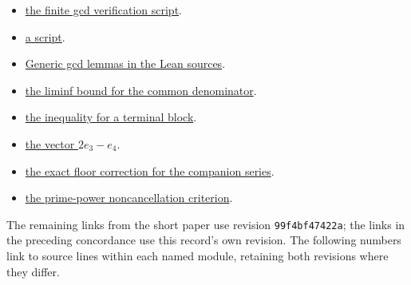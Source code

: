 \begin{itemize}[leftmargin=*]
\item \href{https://github.com/wcook04/plectis-erdos/blob/f36a98bf3d3e6f65f1074e3b800e3293d5b8a51a/ErdosProblems/Erdos68/scripts/check_finite_source.py}{the finite gcd verification script}.
\item \href{https://github.com/wcook04/plectis-erdos/blob/f36a98bf3d3e6f65f1074e3b800e3293d5b8a51a/ErdosProblems/Erdos68/scripts/check_moment_saturation.py}{a script}.
\item \href{https://github.com/wcook04/plectis-erdos/blob/f36a98bf3d3e6f65f1074e3b800e3293d5b8a51a/ErdosProblems/Erdos68/TailIdealCertificate.lean}{Generic gcd lemmas in the Lean sources}.
\item \href{https://github.com/wcook04/plectis-erdos/blob/0b500c7cf8e8bb7ae343484378df02f277fb8194/lean/ErdosProblems/Erdos68/PaperCompleteLiminf.lean#L42}{the liminf bound for the common denominator}.
\item \href{https://github.com/wcook04/plectis-erdos/blob/d788dd4b8c59f2246000f2ed98fffb8a5e8ac72e/lean/ErdosProblems/Erdos68/ChannelIntegralCongruence.lean#L524-L529}{the inequality for a terminal block}.
\item \href{https://github.com/wcook04/plectis-erdos/blob/99f4bf47422abbd8757cbb22b50ba079d764d3a7/ErdosProblems/Erdos68/FactorialChannelCertificate.lean#L101}{the vector $2e_3-e_4$}.
\item \href{https://github.com/wcook04/plectis-erdos/blob/f36a98bf3d3e6f65f1074e3b800e3293d5b8a51a/ErdosProblems/Erdos68/CompanionConstantCarryLaw.lean}{the exact floor correction for the companion series}.
\item \href{https://github.com/wcook04/plectis-erdos/blob/f36a98bf3d3e6f65f1074e3b800e3293d5b8a51a/ErdosProblems/Erdos68/PrimePoleCriterion.lean}{the prime-power noncancellation criterion}.
\end{itemize}
\endgroup

The remaining links from the short paper use revision
\texttt{99f4bf47422a}; the links in the preceding concordance use this
record's own revision. The following numbers link to source lines within
each named module, retaining both revisions where they differ.


